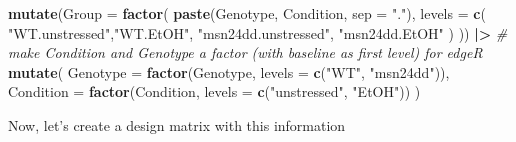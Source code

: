 \documentclass[
]{book}
\newenvironment{Shaded}{\begin{snugshade}}{\end{snugshade}}
\newcommand{\AttributeTok}[1]{\textcolor[rgb]{0.13,0.29,0.53}{#1}}
\newcommand{\CommentTok}[1]{\textcolor[rgb]{0.56,0.35,0.01}{\textit{#1}}}
\newcommand{\DecValTok}[1]{\textcolor[rgb]{0.00,0.00,0.81}{#1}}
\newcommand{\FunctionTok}[1]{\textcolor[rgb]{0.13,0.29,0.53}{\textbf{#1}}}
\newcommand{\NormalTok}[1]{#1}
\newcommand{\OtherTok}[1]{\textcolor[rgb]{0.56,0.35,0.01}{#1}}
\newcommand{\SpecialCharTok}[1]{\textcolor[rgb]{0.81,0.36,0.00}{\textbf{#1}}}
\newcommand{\StringTok}[1]{\textcolor[rgb]{0.31,0.60,0.02}{#1}}
\begin{document}
\begin{Shaded}
\begin{Highlighting}[]
  \FunctionTok{mutate}\NormalTok{(}\AttributeTok{Group =} \FunctionTok{factor}\NormalTok{(}
    \FunctionTok{paste}\NormalTok{(Genotype, Condition, }\AttributeTok{sep =} \StringTok{"."}\NormalTok{),}
    \AttributeTok{levels =} \FunctionTok{c}\NormalTok{(}
      \StringTok{"WT.unstressed"}\NormalTok{,}\StringTok{"WT.EtOH"}\NormalTok{,}
      \StringTok{"msn24dd.unstressed"}\NormalTok{, }\StringTok{"msn24dd.EtOH"}
\NormalTok{    )}
\NormalTok{  )) }\SpecialCharTok{|\textgreater{}}
  \CommentTok{\# make Condition and Genotype a factor (with baseline as first level) for edgeR}
  \FunctionTok{mutate}\NormalTok{(}
    \AttributeTok{Genotype =} \FunctionTok{factor}\NormalTok{(Genotype,}
                      \AttributeTok{levels =} \FunctionTok{c}\NormalTok{(}\StringTok{"WT"}\NormalTok{, }\StringTok{"msn24dd"}\NormalTok{)),}
    \AttributeTok{Condition =} \FunctionTok{factor}\NormalTok{(Condition,}
                       \AttributeTok{levels =} \FunctionTok{c}\NormalTok{(}\StringTok{"unstressed"}\NormalTok{, }\StringTok{"EtOH"}\NormalTok{))}
\NormalTok{  )}
\end{Highlighting}
\end{Shaded}

Now, let's create a design matrix with this information

\begin{Shaded}
\end{Shaded}
\end{document}

